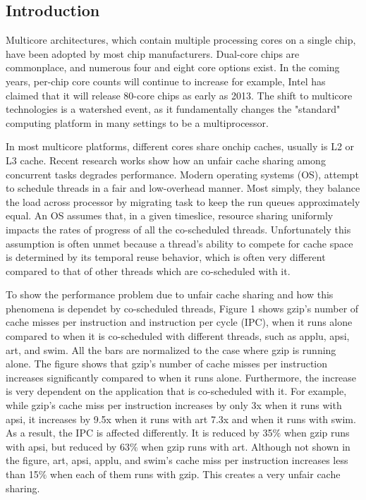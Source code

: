 \documentclass[a4paper,10pt]{article}
\begin{document}
\vspace{4ex}	%
\begin{multicols}{2}

\section{Introduction}

Multicore architectures, which contain multiple processing cores on a single chip, have been adopted by most chip manufacturers.
Dual-core chips are commonplace, and numerous four and eight core options exist. In the coming years, per-chip core counts will continue to
increase for example, Intel has claimed that it will release 80-core chips as early as 2013. The shift to multicore technologies is a 
watershed event, as it fundamentally changes the "standard" computing platform in many settings to be a multiprocessor. 

In most multicore platforms, different cores share onchip caches, usually is L2 or L3 cache. Recent research works show how an unfair cache sharing 
among concurrent tasks degrades performance. Modern operating systems (OS), attempt to schedule threads in a fair and low-overhead manner. 
Most simply, they balance the load across processor by migrating task to keep the run queues approximately equal. An OS assumes that, 
in a given timeslice, resource sharing uniformly impacts the rates of progress of all the co-scheduled threads. 
Unfortunately this assumption is often unmet because a thread's ability to compete for cache space is determined by its temporal reuse behavior,
which is often very different compared to that of other threads which are co-scheduled with it. 

To show the performance problem due to unfair cache sharing and how this phenomena is dependet by co-scheduled threads, Figure 1 shows
gzip's number of cache misses per instruction and instruction per cycle (IPC), when it runs alone compared to when it is co-scheduled with 
different threads, such as applu, apsi, art, and swim. All the bars are normalized to the case where gzip is running alone. The figure shows that gzip's 
number of cache misses per instruction increases significantly compared to when it runs alone. Furthermore, the increase is very dependent on the 
application that is co-scheduled with it. For example, while gzip's cache miss per instruction increases by only 3x when it runs with apsi, it 
increases by 9.5x when it runs with art 7.3x and when it runs with swim. As a result, the IPC is affected differently. It is reduced by
35$\%$ when gzip runs with apsi, but reduced by 63$\%$ when gzip runs with art. Although not shown in the figure, art, apsi, applu, 
and swim's cache miss per instruction increases less than 15$\%$ when each of them runs with gzip. This creates a very unfair cache sharing.



\end{multicols}
\end{document}
